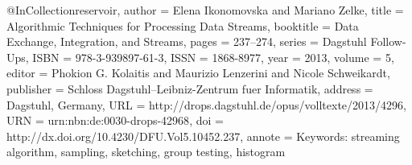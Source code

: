 
@InCollection{reservoir,
  author =	{Elena Ikonomovska and Mariano Zelke},
  title =	{{Algorithmic Techniques for Processing Data Streams}},
  booktitle =	{Data Exchange, Integration, and Streams},
  pages =	{237--274},
  series =	{Dagstuhl Follow-Ups},
  ISBN =	{978-3-939897-61-3},
  ISSN =	{1868-8977},
  year =	{2013},
  volume =	{5},
  editor =	{Phokion G. Kolaitis and Maurizio Lenzerini and Nicole Schweikardt},
  publisher =	{Schloss Dagstuhl--Leibniz-Zentrum fuer Informatik},
  address =	{Dagstuhl, Germany},
  URL =		{http://drops.dagstuhl.de/opus/volltexte/2013/4296},
  URN =		{urn:nbn:de:0030-drops-42968},
  doi =		{http://dx.doi.org/10.4230/DFU.Vol5.10452.237},
  annote =	{Keywords: streaming algorithm, sampling, sketching, group testing, histogram}
}